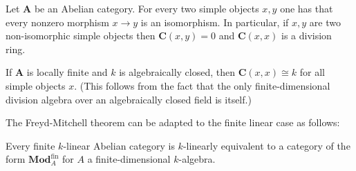 
    \begin{theorem}
        Let $\mathbf{A}$ be an Abelian category. For every two simple objects $x,y$ one has that every nonzero morphism $x\rightarrow y$ is an isomorphism. In particular, if $x,y$ are two non-isomorphic simple objects then $\mathbf{C}(x, y)=0$ and $\mathbf{C}(x, x)$ is a division ring.
    \end{theorem}
    \begin{result}
        If $\mathbf{A}$ is locally finite and $k$ is algebraically closed, then $\mathbf{C}(x, x)\cong k$ for all simple objects $x$. (This follows from the fact that the only finite-dimensional division algebra over an algebraically closed field is itself.)
    \end{result}

    The Freyd-Mitchell theorem can be adapted to the finite linear case as follows:
    \begin{theorem}[Deligne]
        Every finite $k$-linear Abelian category is $k$-linearly equivalent to a category of the form $\mathbf{Mod}_A^{\text{fin}}$ for $A$ a finite-dimensional $k$-algebra.
    \end{theorem}

